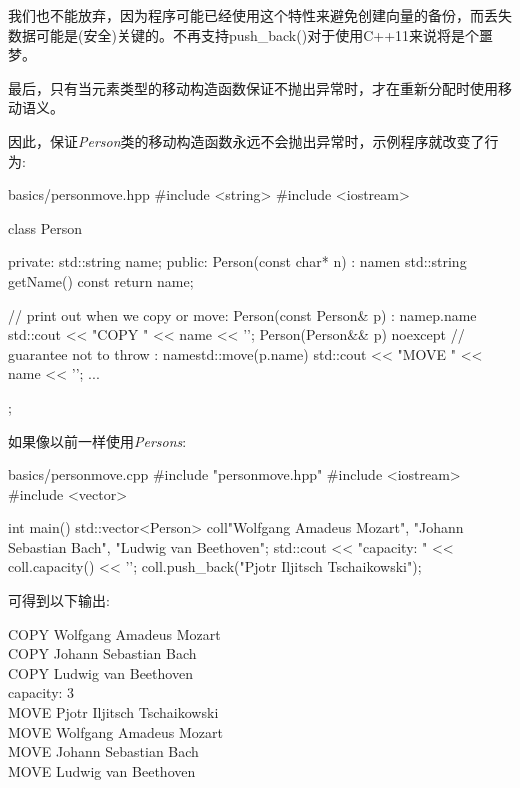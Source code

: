 我们也不能放弃，因为程序可能已经使用这个特性来避免创建向量的备份，而丢失数据可能是(安全)关键的。不再支持push\_back()对于使用C++11来说将是个噩梦。\par

最后，只有当元素类型的移动构造函数保证不抛出异常时，才在重新分配时使用移动语义。\par


因此，保证\textit{Person}类的移动构造函数永远不会抛出异常时，示例程序就改变了行为:\par

\begin{codeboxt}[cpp]{basics/personmove.hpp}
#include <string>
#include <iostream>

class Person {
  private:
  std::string name;
  public:
  Person(const char* n)
  : name{n} {
  }
  std::string getName() const {
    return name;
  }

  // print out when we copy or move:
  Person(const Person& p)
  : name{p.name} {
    std::cout << "COPY " << name << '\n';
  }
  Person(Person&& p) noexcept // guarantee not to throw
  : name{std::move(p.name)} {
    std::cout << "MOVE " << name << '\n';
  }
  ...
};
\end{codeboxt}

如果像以前一样使用\textit{Persons}:\par

\begin{codeboxt}[cpp]{basics/personmove.cpp}
#include "personmove.hpp"
#include <iostream>
#include <vector>

int main()
{
  std::vector<Person> coll{"Wolfgang Amadeus Mozart",
    "Johann Sebastian Bach",
    "Ludwig van Beethoven"};
  std::cout << "capacity: " << coll.capacity() << '\n';
  coll.push_back("Pjotr Iljitsch Tschaikowski");
}
\end{codeboxt}

可得到以下输出:\par

\begin{myOutput}
COPY Wolfgang Amadeus Mozart \\
COPY Johann Sebastian Bach \\
COPY Ludwig van Beethoven \\
capacity: 3 \\
MOVE Pjotr Iljitsch Tschaikowski \\
MOVE Wolfgang Amadeus Mozart \\
MOVE Johann Sebastian Bach \\
MOVE Ludwig van Beethoven
\end{myOutput}


